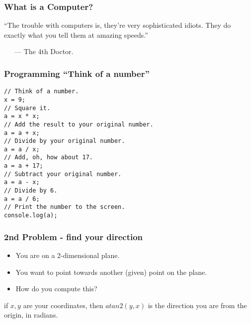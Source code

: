 \documentclass{beamer}
\begin{document}
\begin{frame}
\frametitle{What is a Computer?}
\large

``The trouble with computers is, they're very sophisticated idiots. They do exactly what you tell them at amazing speeds.'' 

~~~--- The 4th Doctor.

\end{frame}

\begin{frame}[fragile]
\frametitle{Programming ``Think of a number''}

\begin{codeblock}
\begin{verbatim}
// Think of a number.                                                                                                     
x = 9;
// Square it.                                                                                                                  
a = x * x;
// Add the result to your original number.                                                                                     
a = a + x;
// Divide by your original number.                                                                                             
a = a / x;
// Add, oh, how about 17.                                                                                                      
a = a + 17;
// Subtract your original number.                                                                                              
a = a - x;
// Divide by 6.                                                                                                                
a = a / 6;
// Print the number to the screen.
console.log(a);
\end{verbatim}                
\end{codeblock}
\end{frame}

\begin{frame}[fragile]
\frametitle{2nd Problem - find your direction}
\Large

\begin{itemize}
\item You are on a 2-dimensional plane.
\item You want to point towards another (given) point on the plane.
\item How do you compute this?
\end{itemize}

\frameskip

if $x,y$ are your coordinates, then $atan2(y,x)$
is the direction you are from the origin, in radians.

\end{frame}
\end{document}
